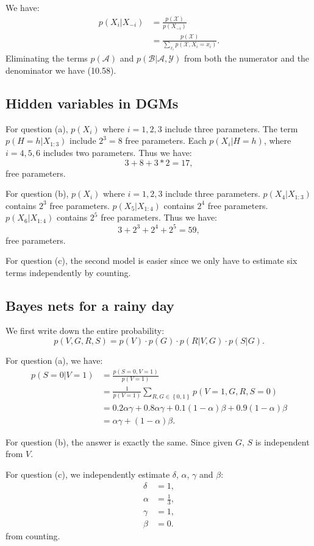 \documentclass[UTF8]{ctexart}
\begin{document}
We have:
$$
\begin{aligned}
p(X_{i}|X_{-i})&=\frac{p(\mathcal{X})}{p(X_{-i})}\\
&=\frac{p(\mathcal{X})}{\sum_{x_{i}}p(\mathcal{X},X_{i}=x_{i})}.
\end{aligned}
$$
Eliminating the terms $p(\mathcal{A})$ and $p(\mathcal{B}|\mathcal{A},\mathcal{Y})$
from both the numerator and the denominator we have (10.58).

\subsection{Hidden variables in DGMs}
For question (a), $p(X_{i})$ where $i=1,2,3$ include three parameters.
The term $p(H=h|X_{1:3})$ include $2^{3}=8$ free parameters.
Each $p(X_{i}|H=h)$, where $i=4,5,6$ includes two parameters.
Thus we have:
$$3+8+3*2=17,$$
free parameters.

For question (b), $p(X_{i})$ where $i=1,2,3$ include three parameters.
$p(X_{4}|X_{1:3})$ contains $2^{3}$ free parameters.
$p(X_{5}|X_{1:4})$ contains $2^{4}$ free parameters.
$p(X_{6}|X_{1:4})$ contains $2^{5}$ free parameters.
Thus we have:
$$3+2^{3}+2^{4}+2^{5}=59,$$
free parameters.

For question (c), the second model is easier since we only have to estimate six terms independently by counting.

\subsection{Bayes nets for a rainy day}
We first write down the entire probability:
$$p(V,G,R,S)=p(V)\cdot p(G)\cdot p(R|V,G)\cdot p(S|G).$$

For question (a), we have:
$$
\begin{aligned}
p(S=0|V=1)&=\frac{p(S=0,V=1)}{p(V=1)}\\
&=\frac{1}{p(V=1)}\sum_{R,G\in\left\{0,1 \right\}}p(V=1,G,R,S=0)\\
&=0.2\alpha\gamma+0.8\alpha\gamma+0.1(1-\alpha)\beta+0.9(1-\alpha)\beta\\
&=\alpha\gamma+(1-\alpha)\beta.
\end{aligned}
$$

For question (b), the answer is exactly the same.
Since given $G$, $S$ is independent from $V$.

For question (c), we independently estimate $\delta$, $\alpha$, $\gamma$ and $\beta$:
$$
\begin{aligned}
\delta&=1,\\
\alpha&=\frac{1}{3},\\
\gamma&=1,\\
\beta&=0.
\end{aligned}
$$
from counting.
\end{document}

